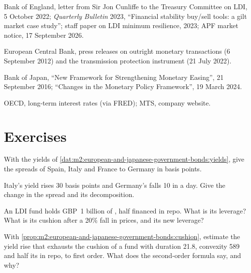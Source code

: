 \begin{omsources}
\item Bank of England, letter from Sir Jon Cunliffe to the Treasury Committee on
LDI, 5 October 2022; \emph{Quarterly Bulletin} 2023, ``Financial stability buy/sell
tools: a gilt market case study''; staff paper on LDI minimum resilience, 2023;
APF market notice, 17 September 2026.
\item European Central Bank, press releases on outright monetary transactions
(6 September 2012) and the transmission protection instrument (21 July 2022).
\item Bank of Japan, ``New Framework for Strengthening Monetary Easing'', 21
September 2016; ``Changes in the Monetary Policy Framework'', 19 March 2024.
\item OECD, long-term interest rates (via FRED); MTS, company website.
\end{omsources}

\section{Exercises}

\begin{exercise}[$\star$]\label{exo:m2:european-and-japanese-government-bonds:1}
With the yields of \cref{dat:m2:european-and-japanese-government-bonds:yields},
give the spreads of Spain, Italy and France to Germany in basis points.
\end{exercise}

\begin{exercise}[$\star$]\label{exo:m2:european-and-japanese-government-bonds:2}
Italy's yield rises 30 basis points and Germany's falls 10 in a day. Give the
change in the spread and its decomposition.
\end{exercise}

\begin{exercise}[$\star$]\label{exo:m2:european-and-japanese-government-bonds:3}
An LDI fund holds GBP~1 billion of , half financed in repo. What is its
leverage? What is its cushion after a 20\% fall in  prices, and its new
leverage?
\end{exercise}

\begin{exercise}[$\star\star$]\label{exo:m2:european-and-japanese-government-bonds:4}
With \cref{prop:m2:european-and-japanese-government-bonds:cushion}, estimate the
yield rise that exhausts the cushion of a fund with duration 21.8, convexity 589
and half its  in repo, to first order. What does the second-order formula
say, and why?
\end{exercise}

